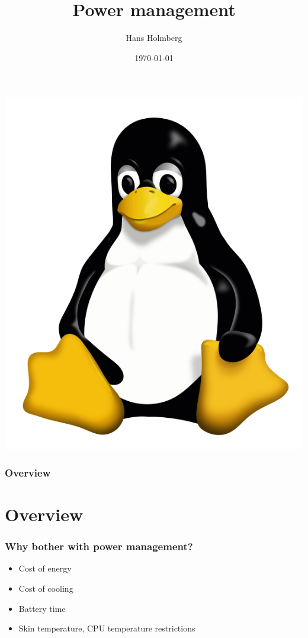 \documentclass{beamer}
\title[TLKDCC Power management]{Power management}
\author{Hans Holmberg}
\institute[LKTP]
{
Linux Kernel Teaching Project \\ 
\medskip
\textit{hans.holmberg@gmail.com}
}
\date{\today}
\begin{document}
\begin{frame}
\titlepage
\includegraphics{../common/tux} 
\end{frame}

\begin{frame}
\frametitle{Overview}
\tableofcontents 
\end{frame}

\section{Overview}

\begin{frame}
\frametitle{Why bother with power management?}
\begin{itemize}
\item Cost of energy
\item Cost of cooling
\item Battery time
\item Skin temperature, CPU temperature restrictions
\end{itemize}
\end{frame}
\end{document}
